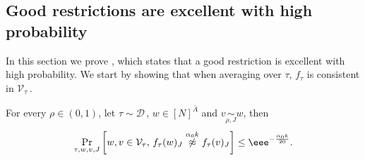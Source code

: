 \documentclass{toc}
\newcommand{\Prob}[2][]{\Pr_{{#1}}\left[#2\right]} %
\newcommand\f{f} %
\newcommand\neqg[1]{\stackrel{{#1}}{ \not\approx}} %
\newcommand\cons{\mathcal{V}} %
\newcommand\cor[1]{\underset{\scriptscriptstyle#1}{\sim}} %
\newcommand\rest[1]{{\bar{#1}}}  %
\begin{document}
%
\hfill \qedsymbol
        
\subsection{Good restrictions are excellent with high probability}
\label{sec:good implies excellent}
In this section we prove , which states that a good restriction is excellent with high probability. We start by showing that when averaging over $\tau$, $\f_\tau$ is consistent in $\cons_\tau$\,.

\begin{claim}\label{claim:many excellent}
	For every $\rho\in (0,1)$, let $\tau\sim\mathcal{D}$\,, $w\in[N]^{\rest{A}}$ and $v\cor{\rho,J}{w}$, then
	\[ \Prob[\tau, w,v,J]{ w,v\in\cons_\tau, \, f_\tau(w)_J \neqg{\alpha_0 k} f_\tau(v)_J} \leq \eee^{-\frac{\alpha_0 k}{20}}. \]
\end{claim}
\end{document}

